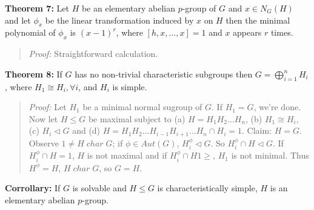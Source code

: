 {\bf Theorem 7:}
Let $H$ be an elementary abelian $p$-group of $G$ and $x \in N_G(H)$ and let $\phi_x$
be the linear transformation induced by $x$ on $H$ then the minimal polynomial of
$\phi_x$ is $(x-1)^r$, where $[h,x, \ldots, x]= 1$ and $x$ appears $r$ times.
\begin{quote}
\emph{Proof:}  
Straightforward calculation.
\end{quote}
{\bf Theorem 8:}  If $G$ has no non-trivial characteristic subgroups then
$G= \bigoplus_{i=1}^n H_i$, where $H_1 \cong H_i, \forall i$, and $H_i$ is
simple.
\begin{quote}
\emph{Proof:} Let $H_1$ be a minimal normal sugroup of $G$.  If $H_1 = G$, we're done.
Now let $H \le G$ be maximal subject to (a) $H=H_1 H_2 \ldots H_n$, (b) $H_1 \cong H_i$,
(c) $H_i \lhd G$ and (d)
$H=H_1 H_2 \ldots H_{i-1} H_{i+1} \ldots H_n \cap H_i = 1$.  Claim:  $H=G$.  Observe
$1 \ne H \; char \; G$; if $\phi \in Aut(G)$, 
$H_i^{\phi} \lhd G$.
So $H_i^{\phi} \cap H \lhd G$.
If $H_i^{\phi} \cap H =1$, $H$ is not maximal and if
$H_i^{\phi} \cap H 1\ge $, $H_1$ is not minimal.
Thus $H^{\phi} = H$, $H \; char \; G$, so $G=H$.
\end{quote}
{\bf Corrollary:} If $G$ is solvable and $H \le G$ is characteristically simple, $H$
is an elementary abelian $p$-group.

